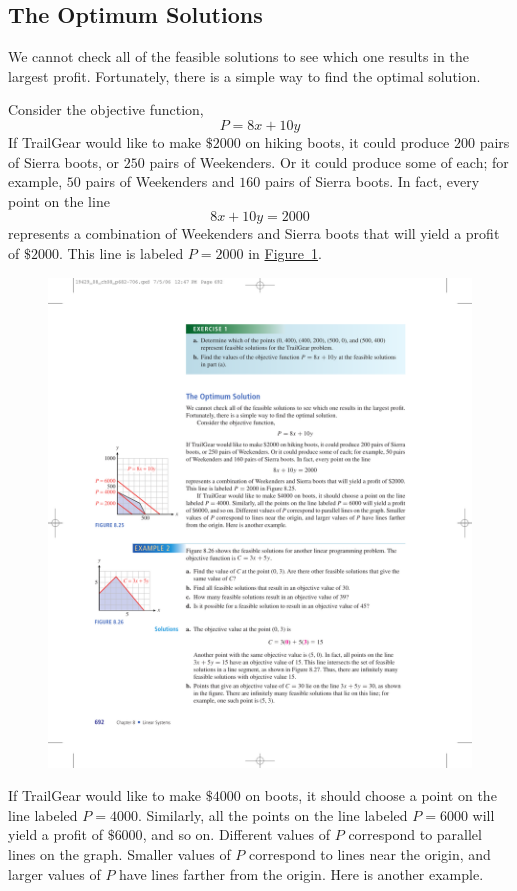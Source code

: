 \documentclass[10pt,]{book}
\theoremstyle{plain}
\theoremstyle{definition}
\theoremstyle{definition}
\theoremstyle{definition}
\numberwithin{equation}{part}
\begin{document}
\subsection[{The Optimum Solutions}]{The Optimum Solutions}\label{subsection-3}
We cannot check all of the feasible solutions to see which one results in the largest profit. Fortunately, there is a simple way to find the optimal solution.%
\par
Consider the objective function,%
\begin{equation*}
P = 8x + 10y
\end{equation*}
If TrailGear would like to make \(\$2000\) on hiking boots, it could produce \(200\) pairs of Sierra boots, or \(250\) pairs of Weekenders. Or it could produce some of each; for example, \(50\) pairs of Weekenders and \(160\) pairs of Sierra boots. In fact, every point on the line%
\begin{equation*}
8x + 10y = 2000
\end{equation*}
represents a combination of Weekenders and Sierra boots that will yield a profit of \(\$2000\). This line is labeled \(P = 2000\) in \hyperref[fig-objective-function-contours-over-feasibles]{Figure~\ref{fig-objective-function-contours-over-feasibles}}.%
\leavevmode%
\begin{figure}
\centering
\includegraphics[width=0.5\linewidth]{images/fig-objective-function-contours-over-feasibles}
\caption{\label{fig-objective-function-contours-over-feasibles}}
\end{figure}
\par
If TrailGear would like to make \(\$4000\) on boots, it should choose a point on the line labeled \(P = 4000\). Similarly, all the points on the line labeled \(P = 6000\) will yield a profit of \(\$6000\), and so on. Different values of \(P\) correspond to parallel lines on the graph. Smaller values of \(P\) correspond to lines near the origin, and larger values of \(P\) have lines farther from the origin. Here is another example.%
\end{document}
